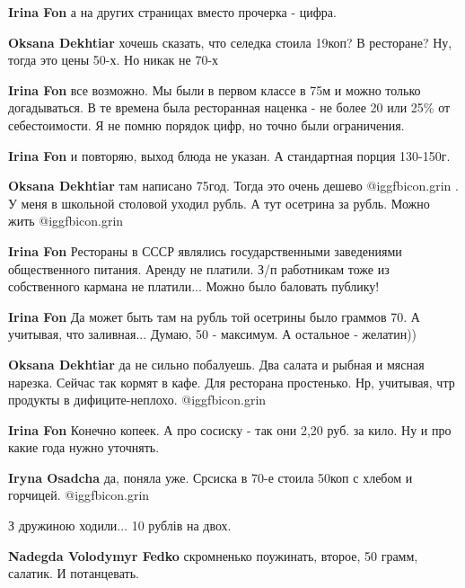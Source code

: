 \begin{itemize}
\begin{itemize}
\begin{itemize}
\textbf{Irina Fon} а на других страницах вместо прочерка - цифра.

\textbf{Oksana Dekhtiar} хочешь сказать, что селедка стоила 19коп? В ресторане? Ну, тогда это цены 50-х. Но никак не 70-х

\textbf{Irina Fon} все возможно. Мы были в первом классе в 75м и можно только догадываться. В те времена была ресторанная наценка - не более 20 или 25\% от себестоимости. Я не помню порядок цифр, но точно были ограничения.

\textbf{Irina Fon} и повторяю, выход блюда не указан. А стандартная порция 130-150г.

\textbf{Oksana Dekhtiar} там написано 75год. Тогда это очень дешево  @igg{fbicon.grin} . У меня в школьной столовой уходил рубль. А тут осетрина за рубль. Можно жить @igg{fbicon.grin} 

\textbf{Irina Fon} Рестораны в СССР являлись государственными заведениями общественного питания. Аренду не платили. З/п работникам тоже из собственного кармана не платили... Можно было баловать публику!

\textbf{Irina Fon} Да может быть там на рубль той осетрины было граммов 70. А учитывая, что заливная... Думаю, 50 - максимум. А остальное - желатин))

\textbf{Oksana Dekhtiar} да не сильно побалуешь. Два салата и рыбная и мясная нарезка. Сейчас так кормят в кафе. Для ресторана простенько. Нр, учитывая, чтр продукты в дифиците-неплохо.  @igg{fbicon.grin} 

\textbf{Irina Fon} Конечно копеек. А про сосиску - так они 2,20 руб. за кило. Ну и про какие года нужно уточнять.

\textbf{Iryna Osadcha} да, поняла уже. Срсиска в 70-е стоила 50коп с хлебом и горчицей.  @igg{fbicon.grin} 
\end{itemize} %

\end{itemize} %


З дружиною ходили... 10 рублів на двох.

\textbf{Nadegda Volodymyr Fedko} скромненько поужинать, второе, 50 грамм, салатик. И потанцевать.



\end{itemize}
